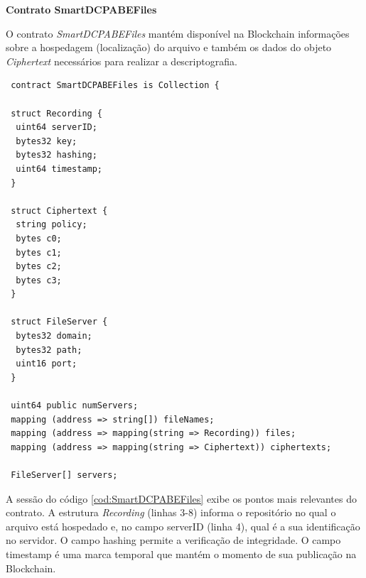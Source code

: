 \documentclass[a4paper,11pt]{article}
\begin{document}
\textbf{Contrato SmartDCPABEFiles}
\label{sec:sub:criptografia-abe}


O contrato \emph{SmartDCPABEFiles} mantém disponível na Blockchain informações sobre a hospedagem (localização) do arquivo e também os dados do objeto \emph{Ciphertext} necessários para realizar a descriptografia.


\begin{lstlisting}
 contract SmartDCPABEFiles is Collection {

 struct Recording {
  uint64 serverID;
  bytes32 key;
  bytes32 hashing;
  uint64 timestamp;
 }

 struct Ciphertext {
  string policy;
  bytes c0;
  bytes c1;
  bytes c2;
  bytes c3;
 }

 struct FileServer {
  bytes32 domain;
  bytes32 path;
  uint16 port;
 }

 uint64 public numServers;
 mapping (address => string[]) fileNames;
 mapping (address => mapping(string => Recording)) files;
 mapping (address => mapping(string => Ciphertext)) ciphertexts;

 FileServer[] servers;
\end{lstlisting}


A sessão do código \ref{cod:SmartDCPABEFiles} exibe os pontos mais relevantes do contrato.
A estrutura \emph{Recording} (linhas 3-8) informa o repositório no qual o arquivo está hospedado e, no campo serverID (linha 4), qual é a sua identificação no servidor.
O campo hashing permite a verificação de integridade.
O campo timestamp é uma marca temporal que mantém o momento de sua publicação na Blockchain. %
\end{document}
